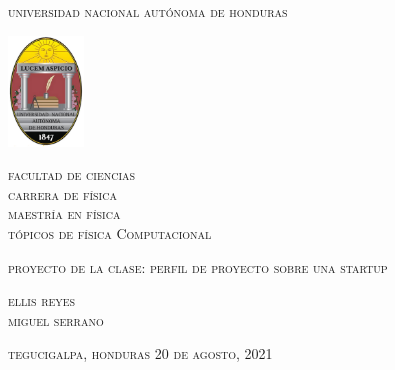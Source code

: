 \documentclass[12pt,a4paper,openright]{article}
\begin{document}

\begin{center}
\vspace{-0.5cm}
{\Large\textsc{universidad nacional autónoma de honduras}}
\vspace{0.5cm}

\begin{center}
  \includegraphics[width=2cm]{unah}
\end{center}
\vspace{1cm}

{\large
\textsc{facultad de ciencias}\\
\textsc{carrera de física}\\
\vspace{0.45cm}
\textsc{maestría en física}\\
\vspace{0.75cm}
\textsc{t\'opicos de f\'isica Computacional}\\
}

\normalsize\textsc{proyecto de la clase: perfil de proyecto sobre una startup }
\vspace{1.15cm}

{\large\textsc{ellis reyes\\miguel serrano}}
\vspace{5cm}




{\large\textsc{tegucigalpa, honduras 20 de agosto, 2021}}

\end{center}


\newpage

\end{document}

